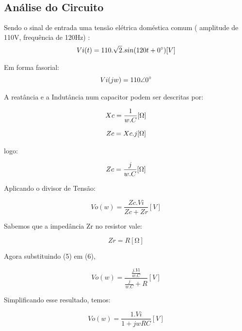 \documentclass[12pt]{article}
\begin{document}

 
 \subsection{Análise do Circuito}

Sendo o sinal de entrada uma tensão elétrica doméstica comum ( amplitude de 110V, frequência de 120Hz) :
\begin{equation}
Vi(t) = 110.\sqrt{2}.sin(120t + 0\degree)  [V]\\
\end{equation}

Em forma fasorial:
\begin{equation}
Vi(jw) = 110\angle 0\degree
\end{equation}

A reatância e a Indutância num capacitor podem ser descritas por:

\begin{equation}
Xc = \frac{1}{w.C}  [\si{\ohm}]\\
\end{equation}

\begin{equation}
Zc = Xc.j [\si{\ohm}]\\
\end{equation}

logo:

\begin{equation}
Zc = \frac{j}{w.C} [\si{\ohm}]\\
\end{equation}

Aplicando o divisor de Tensão:

\begin{equation}
Vo(w)=\frac{Zc.Vi}{Zc+Zr}[V]
\end{equation}

Sabemos que a impedância Zr no resistor vale:

\begin{equation}
Zr= R [\si{\ohm}]
\end{equation}


Agora substituindo (5) em (6), 

\begin{equation}
Vo(w)=\frac{\frac{j.Vi}{w.C}}{\frac{j}{w.C} + R} [V]
\end{equation}

Simplificando esse resultado, temos: 

\begin{equation}
Vo(w)=\frac{1.Vi}{1+jwRC}[V]
\end{equation}
\end{document}
